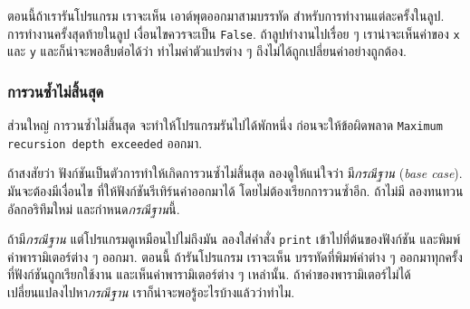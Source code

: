 ตอนนี้ถ้าเรารันโปรแกรม
เราจะเห็น เอาต์พุตออกมาสามบรรทัด สำหรับการทำงานแต่ละครั้งในลูป.
การทำงานครั้งสุดท้ายในลูป เงื่อนไขควรจะเป็น \texttt{False}.
ถ้าลูปทำงานไปเรื่อย ๆ
เราน่าจะเห็นค่าของ \texttt{x} และ \texttt{y}
และก็น่าจะพอสืบต่อได้ว่า ทำไมค่าตัวแปรต่าง ๆ ถึงไม่ได้ถูกเปลี่ยนค่าอย่างถูกต้อง.


\subsubsection{การวนซ้ำไม่สิ้นสุด}


ส่วนใหญ่ การวนซ้ำไม่สิ้นสุด จะทำให้โปรแกรมรันไปได้พักหนึ่ง ก่อนจะให้ข้อผิดพลาด
\texttt{Maximum recursion depth exceeded} ออกมา.


ถ้าสงสัยว่า ฟังก์ชันเป็นตัวการทำให้เกิดการวนซ้ำไม่สิ้นสุด
ลองดูให้แน่ใจว่า มี\textit{กรณีฐาน} (\textit{base case}).
มันจะต้องมีเงื่อนไข ที่ให้ฟังก์ชันรีเทิร์นค่าออกมาได้ โดยไม่ต้องเรียกการวนซ้ำอีก.
ถ้าไม่มี ลองทนทวนอัลกอริทึมใหม่ และกำหนด\textit{กรณีฐาน}นี้.


ถ้ามี\textit{กรณีฐาน}
แต่โปรแกรมดูเหมือนไปไม่ถึงมัน
ลองใส่คำสั่ง \texttt{print} เข้าไปที่ต้นของฟังก์ชัน และพิมพ์ค่าพารามิเตอร์ต่าง ๆ ออกมา.
ตอนนี้ ถ้ารันโปรแกรม
เราจะเห็น บรรทัดที่พิมพ์ค่าต่าง ๆ ออกมาทุกครั้งที่ฟังก์ชันถูกเรียกใช้งาน
และเห็นค่าพารามิเตอร์ต่าง ๆ เหล่านั้น.
ถ้าค่าของพารามิเตอร์ไม่ได้เปลี่ยนแปลงไปหา\textit{กรณีฐาน}
เราก็น่าจะพอรู้อะไรบ้างแล้วว่าทำไม.


